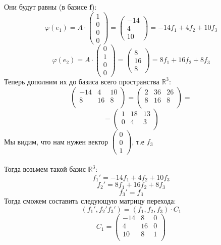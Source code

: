 \documentclass[a4paper,12pt]{article}
\begin{document}
Они будут равны (в базисе $\mathbf{f}$):
\[
\varphi(e_1) = A \cdot \begin{pmatrix}
1 \\ 0\\0\\0
\end{pmatrix}
=
\left(\begin{matrix}
-14 \\
4 \\
10
\end{matrix}\right)
= -14f_1 + 4f_2 + 10f_3
\]
\[
\varphi(e_2) = A \cdot \begin{pmatrix}
0 \\ 1\\0\\0
\end{pmatrix}
=
\left(\begin{matrix}
8 \\
16 \\
8
\end{matrix}\right)
= 8f_1 + 16f_2 + 8f_3
\]
Теперь дополним их до базиса всего пространства $\mathbb{R}^3$:
\[
\begin{pmatrix}
-14 & 4 & 10 \\
8 & 16 & 8\\
\end{pmatrix}
=
\begin{pmatrix}
2 & 36 & 26 \\
8 & 16 & 8 \\
\end{pmatrix}
=
\]
\[
=
\begin{pmatrix}
1 & 18 & 13 \\
0 & 4 & 3\\
\end{pmatrix}
\]
Мы видим, что нам нужен вектор $\begin{pmatrix}
0 \\ 0 \\ 1
\end{pmatrix}$, т.е $f_3$
\\\\
Тогда возьмем такой базис $\mathbb{R}^3$:
\[
f_1' = -14f_1 + 4f_2 + 10f_3
\]
\[
f_2' = 8f_1 + 16f_2 + 8f_3
\]
\[
f_3' = f_3
\]
Тогда сможем составить следующую матрицу перехода:
\[
(f_1', f_2' f_3') = (f_1, f_2, f_3) \cdot C_1
\]
\[
C_1 = \begin{pmatrix}
-14 & 8 & 0 \\4 & 16 & 0 \\ 10 & 8 & 1\\
\end{pmatrix}
\]
\end{document}
